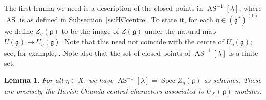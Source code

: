 \documentclass[twoside,12pt,reqno]{amsart}
\newtheorem{Lemma}[Theorem]{Lemma}
\theoremstyle{remark}
\numberwithin{equation}{section}
\def\Spec{\operatorname{Spec}}
\def\g{{\mathfrak g}}
\newcommand{\AS}{\operatorname{AS}}
\begin{document}
The first lemma we need is a description of the closed points in $\AS^{-1}[\lambda]$, where $\AS$ is as defined in Subsection~\ref{ss:HCcentre}. To state it, for each $\eta\in(\g^*)^{(1)}$ we define $Z_\eta(\g)$ to be the image of $Z(\g)$ under the natural map $U(\g)\to U_\eta(\g)$. Note that this need not coincide with the centre of $U_\eta(\g)$; see, for example, \cite[Example 3.19]{Brown Gordon}. Note also that the set of closed points of $\AS^{-1}[\lambda]$ is a finite set.

\begin{Lemma} \label{L: artin schreier preimage}
    For all $\eta \in X$, we have $\AS^{-1}[\lambda] = \Spec Z_\eta(\g)$ as schemes. These are precisely the Harish-Chanda central characters associated to $U_X(\g)$-modules.
\end{Lemma}
\end{document}
